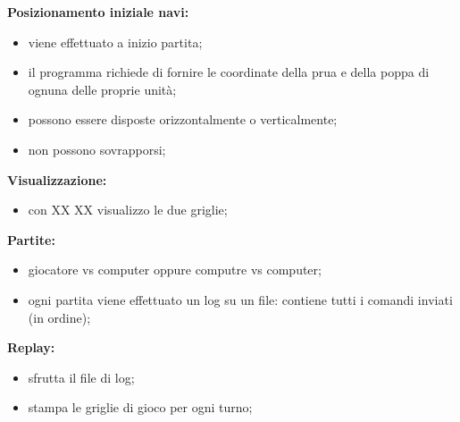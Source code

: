 \documentclass[12pt]{article}
\begin{document}
\noindent \textbf{Posizionamento iniziale navi:}
\begin{itemize}
    \item viene effettuato a inizio partita;
    \item il programma richiede di fornire le coordinate della prua e della poppa di ognuna delle proprie unità;
    \item possono essere disposte orizzontalmente o verticalmente;
    \item non possono sovrapporsi;
\end{itemize}
\noindent\textbf{Visualizzazione:}
\begin{itemize}
    \item con XX XX visualizzo le due griglie;
\end{itemize}

\noindent \textbf{Partite:}
\begin{itemize}
    \item giocatore vs computer oppure computre vs computer;
    \item ogni partita viene effettuato un log su un file: contiene tutti i comandi inviati (in ordine);
\end{itemize}
\noindent \textbf{Replay:}
\begin{itemize}
    \item sfrutta il file di log;
    \item stampa le griglie di gioco per ogni turno;
\end{itemize}
\end{document}
